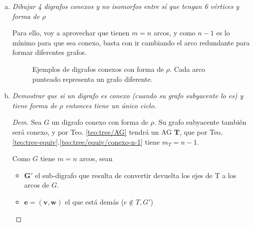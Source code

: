 \documentclass[12pt, a4paper]{report}
\theoremstyle{definition} %
\begin{document}
\begin{enumerate}[a)]
\item \textit{Dibujar 4 digrafos conexos y no isomorfos entre sí que tengan 6 vértices y forma de $\rho$}
    
    Para ello, voy a aprovechar que tienen $m = n$ arcos, y como $n - 1$ es lo mínimo para que sea conexo, basta con ir cambiando el arco redundante para formar diferentes grafos.

    \begin{figure}[H]
        \centering
        \caption*{Ejemplos de digrafos conexos con forma de $\rho$. Cada arco punteado representa un grafo diferente.}
    \end{figure}

\item \textit{Demostrar que si un digrafo es conexo (cuando su grafo subyacente lo es) y tiene forma de $\rho$ entonces tiene un único ciclo.}

    \begin{proof}[Dem]
    Sea $G$ un digrafo conexo con forma de $\rho$. Su grafo subyacente también será conexo, y por Teo. \ref{teo:tree/AG} tendrá un AG $\bm{T}$, que por Teo. \ref{teo:tree-equiv}.\ref{teo:tree/equiv/conexo-n-1} tiene $m_T = n-1$.

    Como $G$ tiene $m = n$ arcos, sean
    \begin{itemize}
        \item $\bm{G'}$ el sub-digrafo que resulta de convertir devuelta los ejes de T a los arcos de $G$.
        \item $\bm{e = (v, w)}$ el que está demás ($e \notin T, G'$)
    \end{itemize}


\end{proof}
\end{enumerate}
\end{document}
